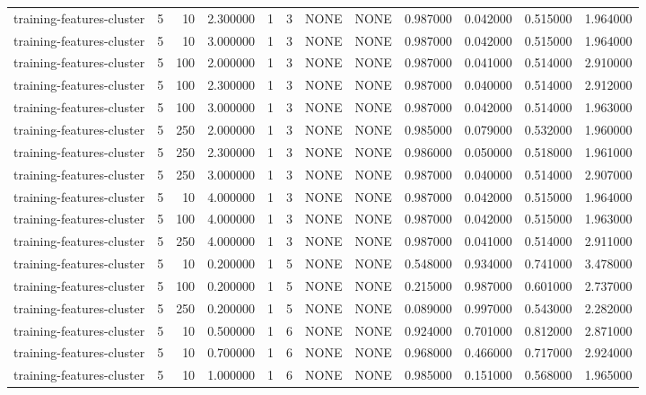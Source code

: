 \begin{tabular}{lrrrllllrrrr}
training-features-cluster & 5 & 10 & 2.300000 & 1 & 3 & NONE & NONE & 0.987000 & 0.042000 & 0.515000 & 1.964000 \\
training-features-cluster & 5 & 10 & 3.000000 & 1 & 3 & NONE & NONE & 0.987000 & 0.042000 & 0.515000 & 1.964000 \\
training-features-cluster & 5 & 100 & 2.000000 & 1 & 3 & NONE & NONE & 0.987000 & 0.041000 & 0.514000 & 2.910000 \\
training-features-cluster & 5 & 100 & 2.300000 & 1 & 3 & NONE & NONE & 0.987000 & 0.040000 & 0.514000 & 2.912000 \\
training-features-cluster & 5 & 100 & 3.000000 & 1 & 3 & NONE & NONE & 0.987000 & 0.042000 & 0.514000 & 1.963000 \\
training-features-cluster & 5 & 250 & 2.000000 & 1 & 3 & NONE & NONE & 0.985000 & 0.079000 & 0.532000 & 1.960000 \\
training-features-cluster & 5 & 250 & 2.300000 & 1 & 3 & NONE & NONE & 0.986000 & 0.050000 & 0.518000 & 1.961000 \\
training-features-cluster & 5 & 250 & 3.000000 & 1 & 3 & NONE & NONE & 0.987000 & 0.040000 & 0.514000 & 2.907000 \\
training-features-cluster & 5 & 10 & 4.000000 & 1 & 3 & NONE & NONE & 0.987000 & 0.042000 & 0.515000 & 1.964000 \\
training-features-cluster & 5 & 100 & 4.000000 & 1 & 3 & NONE & NONE & 0.987000 & 0.042000 & 0.515000 & 1.963000 \\
training-features-cluster & 5 & 250 & 4.000000 & 1 & 3 & NONE & NONE & 0.987000 & 0.041000 & 0.514000 & 2.911000 \\
training-features-cluster & 5 & 10 & 0.200000 & 1 & 5 & NONE & NONE & 0.548000 & 0.934000 & 0.741000 & 3.478000 \\
training-features-cluster & 5 & 100 & 0.200000 & 1 & 5 & NONE & NONE & 0.215000 & 0.987000 & 0.601000 & 2.737000 \\
training-features-cluster & 5 & 250 & 0.200000 & 1 & 5 & NONE & NONE & 0.089000 & 0.997000 & 0.543000 & 2.282000 \\
training-features-cluster & 5 & 10 & 0.500000 & 1 & 6 & NONE & NONE & 0.924000 & 0.701000 & 0.812000 & 2.871000 \\
training-features-cluster & 5 & 10 & 0.700000 & 1 & 6 & NONE & NONE & 0.968000 & 0.466000 & 0.717000 & 2.924000 \\
training-features-cluster & 5 & 10 & 1.000000 & 1 & 6 & NONE & NONE & 0.985000 & 0.151000 & 0.568000 & 1.965000 \\

\end{tabular}
